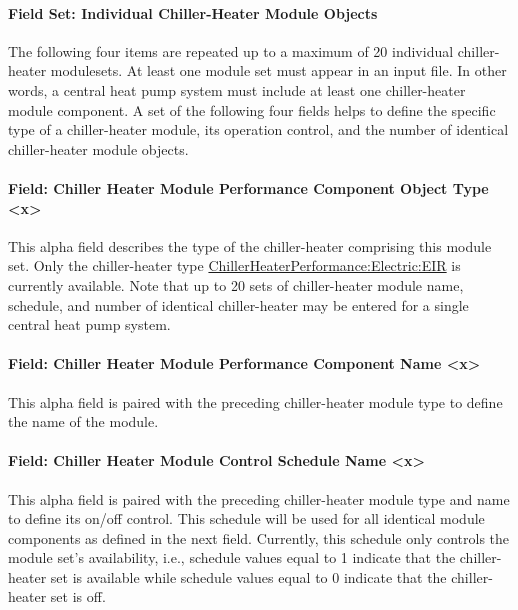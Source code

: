 \paragraph{Field Set: Individual Chiller-Heater Module Objects}\label{field-set-individual-chiller-heater-module-objects}

The following four items are repeated up to a maximum of 20 individual chiller-heater modulesets. At least one module set must appear in an input file. In other words, a central heat pump system must include at least one chiller-heater module component. A set of the following four fields helps to define the specific type of a chiller-heater module, its operation control, and the number of identical chiller-heater module objects.

\paragraph{Field: Chiller Heater Module Performance Component Object Type \textless{}x\textgreater{}}\label{field-chiller-heater-module-performance-component-object-type-x}

This alpha field describes the type of the chiller-heater comprising this module set. Only the chiller-heater type \hyperref[chillerheaterperformancelectriceir]{ChillerHeaterPerformance:Electric:EIR} is currently available. Note that up to 20 sets of chiller-heater module name, schedule, and number of identical chiller-heater may be entered for a single central heat pump system.

\paragraph{Field: Chiller Heater Module Performance Component Name \textless{}x\textgreater{}}\label{field-chiller-heater-module-performance-component-name-x}

This alpha field is paired with the preceding chiller-heater module type to define the name of the module.

\paragraph{Field: Chiller Heater Module Control Schedule Name \textless{}x\textgreater{}}\label{field-chiller-heater-module-control-schedule-name-x}

This alpha field is paired with the preceding chiller-heater module type and name to define its on/off control. This schedule will be used for all identical module components as defined in the next field. Currently, this schedule only controls the module set's availability, i.e., schedule values equal to 1 indicate that the chiller-heater set is available while schedule values equal to 0 indicate that the chiller-heater set is off.

